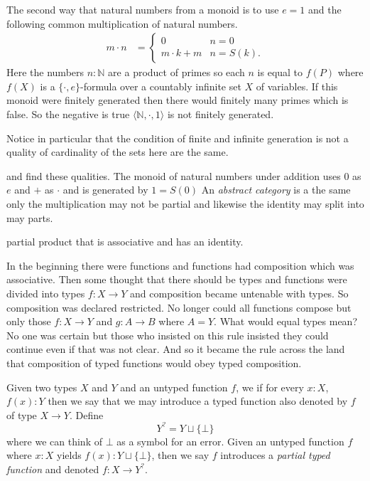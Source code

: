 \documentclass[12pt,twoside,letterpaper]{memoir}
\begin{document}
The second way that natural numbers from a monoid is to use $e=1$ and the 
following common multiplication of natural numbers.
\begin{align*}
    m\cdot n & = \begin{cases} 0 & n=0 \\ m\cdot k +m & n=S(k).\end{cases}
\end{align*}
Here the numbers $n:\mathbb{N}$ are a product of primes so each 
$n$ is equal to $f(P)$ where $f(X)$ is a $\{\cdot,e\}$-formula over 
a countably infinite set $X$ of variables.  If this monoid were finitely generated 
then there would finitely many primes which is false.  So the negative is true
$\langle \mathbb{N},\cdot,1\rangle$ is not finitely generated.  

Notice in particular that the condition of finite and infinite generation is 
not a quality of cardinality of the sets here are the same.



and find these qualities.  The monoid of natural numbers under addition uses $0$ as 
$e$ and $+$ as $\cdot$ and is generated by $1=S(0)$
An \emph{abstract category} is a the same only the multiplication may not be 
partial and likewise the identity may split into may parts.

partial product that is associative and has an identity.



In the beginning there were functions and functions had composition
which was associative.  Then some thought that there should be types 
and functions were divided into types $f:X\to Y$ and composition became 
untenable with types.  So composition was declared restricted.  
No longer could all functions compose but only those $f:X\to Y$ 
and $g:A\to B$ where $A=Y$.  What would equal types mean?  No one 
was certain but those who insisted on this rule insisted they could 
continue even if that was not clear.  And so it became the rule across 
the land that composition of typed functions would obey typed composition.

Given two types $X$ and $Y$ and an untyped function $f$, we if 
for every $x:X$, $f(x):Y$ then we say that we may introduce a typed function 
also denoted by $f$ of type $X\to Y$.  Define 
\[
    Y^? = Y\sqcup \{\bot\}
\]
where we can think of $\bot$ as a symbol for an error.  Given an untyped 
function $f$ where $x:X$ yields $f(x):Y\sqcup\{\bot\}$, then we say $f$ 
introduces a \emph{partial typed function} and denoted $f:X\to Y^?$.
\end{document}
